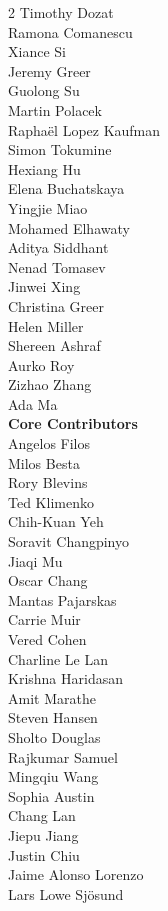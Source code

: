 \begin{multicols}{2}
Timothy Dozat \\
Ramona Comanescu \\
Xiance Si \\
Jeremy Greer \\
Guolong Su \\
Martin Polacek \\
Raphaël Lopez Kaufman \\
Simon Tokumine \\
Hexiang Hu \\
Elena Buchatskaya \\
Yingjie Miao \\
Mohamed Elhawaty \\
Aditya Siddhant \\
Nenad Tomasev \\
Jinwei Xing \\
Christina Greer \\
Helen Miller \\
Shereen Ashraf \\
Aurko Roy \\
Zizhao Zhang \\
Ada Ma \\
\noindent
\textbf{Core Contributors} \\
Angelos Filos \\
Milos Besta \\
Rory Blevins \\
Ted Klimenko \\
Chih-Kuan Yeh \\
Soravit Changpinyo \\
Jiaqi Mu \\
Oscar Chang \\
Mantas Pajarskas \\
Carrie Muir \\
Vered Cohen \\
Charline Le Lan \\
Krishna Haridasan \\
Amit Marathe \\
Steven Hansen \\
Sholto Douglas \\
Rajkumar Samuel \\
Mingqiu Wang \\
Sophia Austin \\
Chang Lan \\
Jiepu Jiang \\
Justin Chiu \\
Jaime Alonso Lorenzo \\
Lars Lowe Sjösund \\

\end{multicols}
